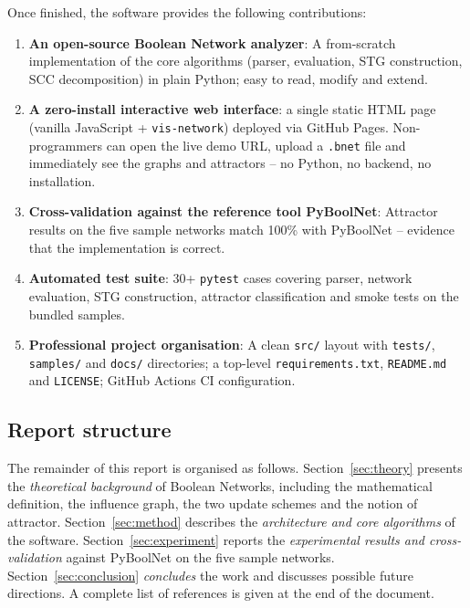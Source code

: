 \documentclass[oneside,final]{hcmut-report}
\begin{document}
Once finished, the software provides the following contributions:
\begin{enumerate}[leftmargin=*]
    \item \textbf{An open-source Boolean Network analyzer}: A from-scratch implementation of the core algorithms (parser, evaluation, STG construction, SCC decomposition) in plain Python; easy to read, modify and extend.
    \item \textbf{A zero-install interactive web interface}: a single static HTML page (vanilla JavaScript + \texttt{vis-network}) deployed via GitHub Pages. Non-programmers can open the live demo URL, upload a \texttt{.bnet} file and immediately see the graphs and attractors -- no Python, no backend, no installation.
    \item \textbf{Cross-validation against the reference tool PyBoolNet}: Attractor results on the five sample networks match 100\% with PyBoolNet -- evidence that the implementation is correct.
    \item \textbf{Automated test suite}: 30+ \texttt{pytest} cases covering parser, network evaluation, STG construction, attractor classification and smoke tests on the bundled samples.
    \item \textbf{Professional project organisation}: A clean \texttt{src/} layout with \texttt{tests/}, \texttt{samples/} and \texttt{docs/} directories; a top-level \texttt{requirements.txt}, \texttt{README.md} and \texttt{LICENSE}; GitHub Actions CI configuration.
\end{enumerate}

\subsection{Report structure}\label{subsec:report-structure}

The remainder of this report is organised as follows. Section~\ref{sec:theory} presents the \textit{theoretical background} of Boolean Networks, including the mathematical definition, the influence graph, the two update schemes and the notion of attractor. Section~\ref{sec:method} describes the \textit{architecture and core algorithms} of the software. Section~\ref{sec:experiment} reports the \textit{experimental results and cross-validation} against PyBoolNet on the five sample networks. Section~\ref{sec:conclusion} \textit{concludes} the work and discusses possible future directions. A complete list of references is given at the end of the document.

\end{document}
